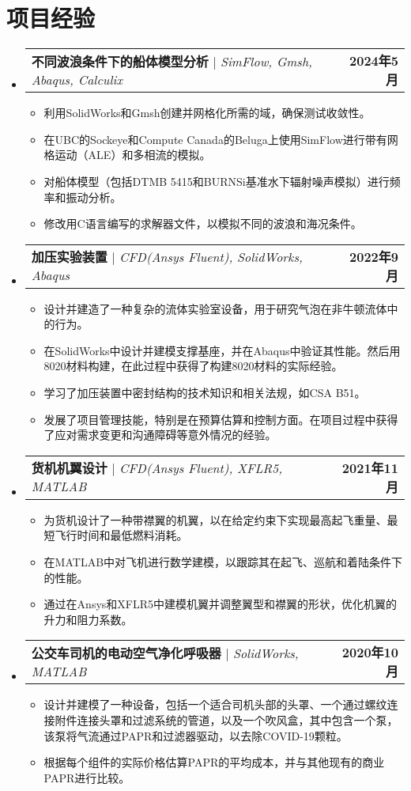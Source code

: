 \documentclass[letterpaper,11pt]{article}
\makeatletter
\newcommand{\resumeItem}[1]{
  \item\small{
    {#1 \vspace{-2pt}}
  }
}
\newcommand{\resumeProjectHeading}[2]{
    \item
    \begin{tabular*}{1.001\textwidth}{l@{\extracolsep{\fill}}r}
      \small#1 & \textbf{\small #2}\\
    \end{tabular*}\vspace{-7pt}
}
\newcommand{\resumeSubHeadingListStart}{\begin{itemize}[leftmargin=0.0in, label={}]}
\newcommand{\resumeSubHeadingListEnd}{\end{itemize}}
\newcommand{\resumeItemListStart}{\begin{itemize}}
\newcommand{\resumeItemListEnd}{\end{itemize}\vspace{-5pt}}
\makeatother
\begin{document}
\section{项目经验}
    \vspace{-10pt}
    \resumeSubHeadingListStart
        \resumeProjectHeading
          {\textbf{不同波浪条件下的船体模型分析} $|$ \emph{SimFlow, Gmsh, Abaqus, Calculix}}{2024年5月}
          \resumeItemListStart
            \resumeItem{利用SolidWorks和Gmsh创建并网格化所需的域，确保测试收敛性。}
            \resumeItem{在UBC的Sockeye和Compute Canada的Beluga上使用SimFlow进行带有网格运动（ALE）和多相流的模拟。}
            \resumeItem{对船体模型（包括DTMB 5415和BURNSi基准水下辐射噪声模拟）进行频率和振动分析。}
            \resumeItem{修改用C语言编写的求解器文件，以模拟不同的波浪和海况条件。}
          \resumeItemListEnd 
          \vspace{-20pt}
        \resumeProjectHeading
          {\textbf{加压实验装置} $|$ \emph{CFD(Ansys Fluent), SolidWorks, Abaqus}}{2022年9月}
          \resumeItemListStart
            \resumeItem{设计并建造了一种复杂的流体实验室设备，用于研究气泡在非牛顿流体中的行为。}
            \resumeItem{在SolidWorks中设计并建模支撑基座，并在Abaqus中验证其性能。然后用8020材料构建，在此过程中获得了构建8020材料的实际经验。}
            \resumeItem{学习了加压装置中密封结构的技术知识和相关法规，如CSA B51。}
            \resumeItem{发展了项目管理技能，特别是在预算估算和控制方面。在项目过程中获得了应对需求变更和沟通障碍等意外情况的经验。}
          \resumeItemListEnd
          \vspace{-45pt}
      \resumeProjectHeading
          {\textbf{货机机翼设计} $|$ \emph{CFD(Ansys Fluent), XFLR5, MATLAB}}{2021年11月}
          \resumeItemListStart
            \resumeItem{为货机设计了一种带襟翼的机翼，以在给定约束下实现最高起飞重量、最短飞行时间和最低燃料消耗。}
            \resumeItem{在MATLAB中对飞机进行数学建模，以跟踪其在起飞、巡航和着陆条件下的性能。}
            \resumeItem{通过在Ansys和XFLR5中建模机翼并调整翼型和襟翼的形状，优化机翼的升力和阻力系数。}
          \resumeItemListEnd
          \vspace{-20pt}
      \resumeProjectHeading
          {\textbf{公交车司机的电动空气净化呼吸器} $|$ \emph{SolidWorks, MATLAB}}{2020年10月}
          \resumeItemListStart
            \resumeItem{设计并建模了一种设备，包括一个适合司机头部的头罩、一个通过螺纹连接附件连接头罩和过滤系统的管道，以及一个吹风盒，其中包含一个泵，该泵将气流通过PAPR和过滤器驱动，以去除COVID-19颗粒。}
            \resumeItem{根据每个组件的实际价格估算PAPR的平均成本，并与其他现有的商业PAPR进行比较。}
          \resumeItemListEnd 
          \resumeSubHeadingListEnd
           \vspace{-20pt}
\end{document}
